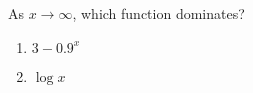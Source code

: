 \bigskip

\item As $x \rightarrow \infty$, which function dominates?

\begin{enumerate}
\item $3 - 0.9^x$
\item $\log x$
\end{enumerate}


